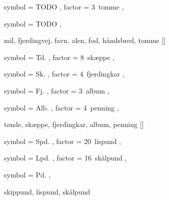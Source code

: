  {
	symbol = { TODO } ,
	factor = { 3~tomme } ,
}

 {
	symbol = { TODO } ,
}

 {
	mil,
	fjerdingvej,
	favn,
	alen,
	fod,
	håndsbred,
	tomme
}[\alen]


 {
	symbol = { Td. } ,
	factor = { 8~skæppe } ,
}

 {
	symbol = { Sk. } ,
	factor = { 4~fjerdingkar } ,
}

 {
	symbol = { Fj. } ,
	factor = { 3~album } ,
}

 {
	symbol = { Alb. } ,
	factor = { 4~penning } ,
}

 {
	tønde,
	skæppe,
	fjerdingkar,
	album,
	penning
}[\hartkorn]


 {
	symbol = { Spd. } ,
	factor = { 20~lispund } ,
}

 {
	symbol = { Lpd. } ,
	factor = { 16~skålpund } ,
}

 {
	symbol = { Pd. } ,
}

 {
	skippund,
	lispund,
	skålpund
}
